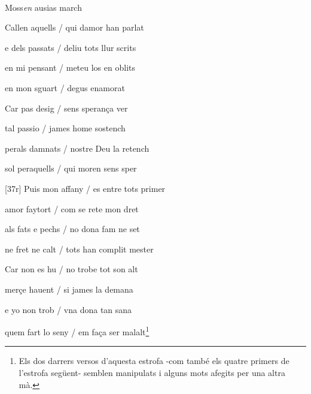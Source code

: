 \documentclass[12pt]{article}
\renewcommand{\espaiAbansEtiquetaPoema}{\vspace{0ex}}
\begin{document}
\begin{estrofa}

\espaiAbansEtiquetaPoema

\\

\begin{rubrica}

Moss\textit{en }ausias march

\end{rubrica}

\end{estrofa}


\begin{estrofa}

 Callen aquells / qui damor han parlat

 e dels passats / deliu tots llur scrits

 en mi pensant / meteu los en oblits

 en mon sguart / degus enamorat

 Car pas desig / sens speran\c{c}a ver

 tal passio / james home sostench

 perals damnats / nostre Deu la retench

 sol peraquells / qui moren sens sper

\end{estrofa}



\begin{estrofa}

 [37r] Puis mon affany / es entre tots primer

 amor faytort / com se rete mon dret

 als fats e pechs / no dona fam ne set

 ne fret ne calt / tots han complit mester

 Car non es hu / no trobe tot son alt

 mer\c{c}e hauent / si james la demana

 e yo non trob / vna dona tan sana

 quem fart lo seny / em fa\c{c}a ser malalt\footnote{Els dos darrers versos
d'aquesta estrofa -com tamb\'{e} els quatre primers de l'estrofa seg\"{u}ent-
semblen manipulats i alguns mots afegits per una altra m\`{a}.}

\end{estrofa}
\end{document}
